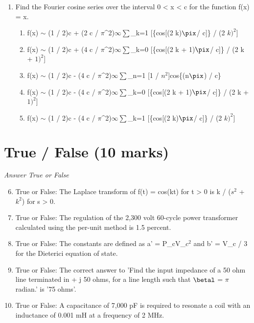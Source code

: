 \documentclass[12pt]{article}
\begin{document}
\begin{enumerate}[label=\arabic*.]
\begin{enumerate}[label=(\alph*)]
    \item 0.075 \ensuremath{\lambda}^2
    \item 0.200 \ensuremath{\lambda}^2
    \item 0.180 \ensuremath{\lambda}^2
    \item 0.089 \ensuremath{\lambda}^2
    \item 0.102 \ensuremath{\lambda}^2
\end{enumerate}
\item Find the Fourier cosine series over the interval 0 \textless{} x \textless{} c for the function f(x) = x.
\begin{enumerate}[label=(\alph*)]
    \item f(x) \ensuremath{\sim} (1 / 2)c + (2 c / \ensuremath{\pi}^2)\ensuremath{\infty}\ensuremath{\sum}\_k=1 [\{cos[(2 k)\ensuremath{\pix}/ c]\} / (2 $k)^2$]
    \item f(x) \ensuremath{\sim} (1 / 2)c + (4 c / \ensuremath{\pi}^2)\ensuremath{\infty}\ensuremath{\sum}\_k=0 [\{cos[(2 k + 1)\ensuremath{\pix}/ c]\} / (2 k + $1)^2$]
    \item f(x) \ensuremath{\sim} (1 / 2)c - (4 c / \ensuremath{\pi}^2)\ensuremath{\infty}\ensuremath{\sum}\_n=1 [1 / $n^2$]cos\{(n\ensuremath{\pix}) / c\}
    \item f(x) \ensuremath{\sim} (1 / 2)c - (4 c / \ensuremath{\pi}^2)\ensuremath{\infty}\ensuremath{\sum}\_k=0 [\{cos[(2 k + 1)\ensuremath{\pix}/ c]\} / (2 k + $1)^2$]
    \item f(x) \ensuremath{\sim} (1 / 2)c - (4 c / \ensuremath{\pi}^2)\ensuremath{\infty}\ensuremath{\sum}\_k=1 [\{cos[(2 k)\ensuremath{\pix}/ c]\} / (2 $k)^2$]
\end{enumerate}
\end{enumerate}

\section*{True / False (10 marks)}
\textit{Answer True or False}
\begin{enumerate}[label=\arabic*.]
\setcounter{enumi}{5}
\item True or False: The Laplace transform of f(t) = cos(kt) for t \textgreater{} 0 is k / ($s^2$ + $k^2$) for s \textgreater{} 0.
\item True or False: The regulation of the 2,300 volt 60-cycle power transformer calculated using the per-unit method is 1.5 percent.
\item True or False: The constants are defined as a' = P\_cV\_$c^2$ and b' = V\_c / 3 for the Dieterici equation of state.
\item True or False: The correct answer to 'Find the input impedance of a 50 ohm line terminated in + j 50 ohms, for a line length such that \ensuremath{\betal} = \ensuremath{\pi} radian.' is '75 ohms'.
\item True or False: A capacitance of 7,000 pF is required to resonate a coil with an inductance of 0.001 mH at a frequency of 2 MHz.
\end{enumerate}
\end{document}
